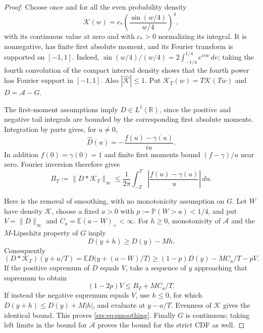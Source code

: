 \documentclass[11pt]{article}
\numberwithin{equation}{section}
\theoremstyle{remark}\newtheorem{remark}[theorem]{Remark}
\newcommand{\R}{\mathbb R}
\newcommand{\E}{\mathbb E}
\newcommand{\Pp}{\mathbb P}
\begin{document}
\begin{proof}
Choose once and for all the even probability density
\[
 \mathcal K(w)=c_*\left(\frac{\sin(w/4)}{w/4}\right)^4,
\]
with its continuous value at zero and with $c_*>0$ normalizing its integral. It is nonnegative, has finite first absolute moment, and its Fourier transform is supported on $[-1,1]$. Indeed, $\sin(w/4)/(w/4)=2\int_{-1/4}^{1/4}e^{ivw}\,dv$; taking the fourth convolution of the compact interval density shows that the fourth power has Fourier support in $[-1,1]$. Also $|\widehat{\mathcal K}|\le1$. Put $\mathcal K_T(w)=T\mathcal K(Tw)$ and $D=\mathcal A-G$.

The first-moment assumptions imply $D\in L^1(\R)$, since the positive and negative tail integrals are bounded by the corresponding first absolute moments. Integration by parts gives, for $u\ne0$,
\[
 \widehat D(u)=-\frac{f(u)-\gamma(u)}{iu}.
\]
In addition $f(0)=\gamma(0)=1$ and finite first moments bound $(f-\gamma)/u$ near zero. Fourier inversion therefore gives
\begin{equation}\label{srs:eq:smoothedbound}
 B_T:=\|D*\mathcal K_T\|_\infty
 \le\frac1{2\pi}\int_{-T}^T\left|\frac{f(u)-\gamma(u)}u\right|\,du.
\end{equation}

Here is the removal of smoothing, with no monotonicity assumption on $G$. Let $W$ have density $\mathcal K$, choose a fixed $a>0$ with $p:=\Pp(W>a)<1/4$, and put $V=\|D\|_\infty$ and $C_a=\E(a-W)_+<\infty$. For $h\ge0$, monotonicity of $\mathcal A$ and the $M$-Lipschitz property of $G$ imply
\[
 D(y+h)\ge D(y)-Mh.
\]
Consequently
\[
 (D*\mathcal K_T)(y+a/T)
 =\E D\bigl(y+(a-W)/T\bigr)
 \ge (1-p)D(y)-MC_a/T-pV.
\]
If the positive supremum of $D$ equals $V$, take a sequence of $y$ approaching that supremum to obtain
\[
 (1-2p)V\le B_T+MC_a/T.
\]
If instead the negative supremum equals $V$, use $h\le0$, for which $D(y+h)\le D(y)+M|h|$, and evaluate at $y-a/T$. Evenness of $\mathcal K$ gives the identical bound. This proves \eqref{srs:eq:smoothing}. Finally $G$ is continuous; taking left limits in the bound for $\mathcal A$ proves the bound for the strict CDF as well.
\end{proof}
\end{document}
